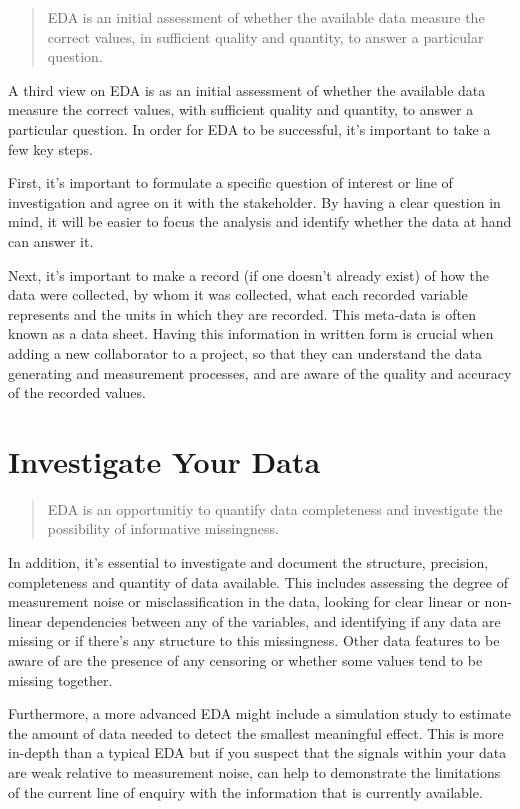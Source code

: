 \documentclass[
  12pt,
]{book}
\begin{document}
\begin{quote}
EDA is an initial assessment of whether the available data measure the correct values, in sufficient quality and quantity, to answer a particular question.
\end{quote}

A third view on EDA is as an initial assessment of whether the available data measure the correct values, with sufficient quality and quantity, to answer a particular question. In order for EDA to be successful, it's important to take a few key steps.

First, it's important to formulate a specific question of interest or line of investigation and agree on it with the stakeholder. By having a clear question in mind, it will be easier to focus the analysis and identify whether the data at hand can answer it.

Next, it's important to make a record (if one doesn't already exist) of how the data were collected, by whom it was collected, what each recorded variable represents and the units in which they are recorded. This meta-data is often known as a data sheet. Having this information in written form is crucial when adding a new collaborator to a project, so that they can understand the data generating and measurement processes, and are aware of the quality and accuracy of the recorded values.

\hypertarget{investigate-your-data}{%
\section{Investigate Your Data}\label{investigate-your-data}}

\begin{quote}
EDA is an opportunitiy to quantify data completeness and investigate the possibility of informative missingness.
\end{quote}

In addition, it's essential to investigate and document the structure, precision, completeness and quantity of data available. This includes assessing the degree of measurement noise or misclassification in the data, looking for clear linear or non-linear dependencies between any of the variables, and identifying if any data are missing or if there's any structure to this missingness. Other data features to be aware of are the presence of any censoring or whether some values tend to be missing together.

Furthermore, a more advanced EDA might include a simulation study to estimate the amount of data needed to detect the smallest meaningful effect. This is more in-depth than a typical EDA but if you suspect that the signals within your data are weak relative to measurement noise, can help to demonstrate the limitations of the current line of enquiry with the information that is currently available.
\end{document}
